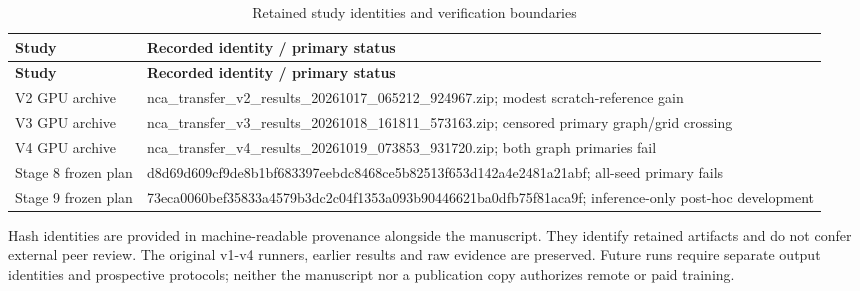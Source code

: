 \documentclass[11pt,a4paper]{article}
\begin{document}
{\small
\begin{longtable}{>{\raggedright\arraybackslash}p{}>{\raggedright\arraybackslash}p{}}
\caption{Retained study identities and verification boundaries}\\
\toprule
\textbf{Study} & \textbf{Recorded identity /\allowbreak{} primary status} \\
\midrule\endfirsthead
\toprule
\textbf{Study} & \textbf{Recorded identity /\allowbreak{} primary status} \\
\midrule\endhead
\bottomrule\endlastfoot
V2 GPU archive & nca\_\allowbreak{}transfer\_\allowbreak{}v2\_\allowbreak{}results\_\allowbreak{}20261017\_\allowbreak{}065212\_\allowbreak{}924967.zip; modest scratch-reference gain \\
V3 GPU archive & nca\_\allowbreak{}transfer\_\allowbreak{}v3\_\allowbreak{}results\_\allowbreak{}20261018\_\allowbreak{}161811\_\allowbreak{}573163.zip; censored primary graph/\allowbreak{}grid crossing \\
V4 GPU archive & nca\_\allowbreak{}transfer\_\allowbreak{}v4\_\allowbreak{}results\_\allowbreak{}20261019\_\allowbreak{}073853\_\allowbreak{}931720.zip; both graph primaries fail \\
Stage 8 frozen plan & d8d69d609cf9de8b1bf683397eebdc8468ce5b82513f653d142a4e2481a21abf; all-seed primary fails \\
Stage 9 frozen plan & 73eca0060bef35833a4579b3dc2c04f1353a093b90446621ba0dfb75f81aca9f; inference-only post-hoc development \\
\end{longtable}
}
Hash identities are provided in machine-readable provenance alongside the manuscript. They identify retained artifacts and do not confer external peer review. The original v1-v4 runners, earlier results and raw evidence are preserved. Future runs require separate output identities and prospective protocols; neither the manuscript nor a publication copy authorizes remote or paid training.
\end{document}
